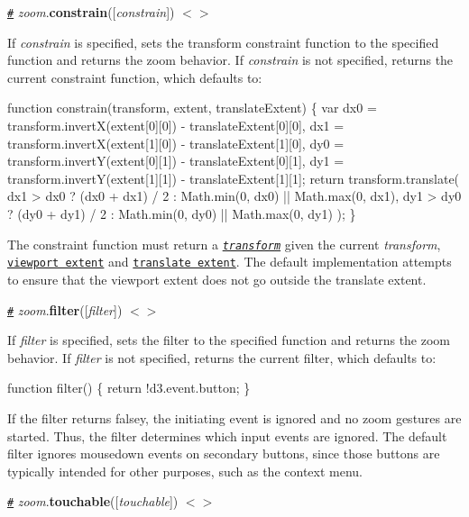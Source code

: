 \href{#zoom_constrain}{\tt \#} {\itshape zoom}.{\bfseries constrain}(\mbox{[}{\itshape constrain}\mbox{]}) \href{https://github.com/d3/d3-zoom/blob/master/src/zoom.js#403}{\tt $<$$>$}

If {\itshape constrain} is specified, sets the transform constraint function to the specified function and returns the zoom behavior. If {\itshape constrain} is not specified, returns the current constraint function, which defaults to\+:


\begin{DoxyCode}
function constrain(transform, extent, translateExtent) \{
  var dx0 = transform.invertX(extent[0][0]) - translateExtent[0][0],
      dx1 = transform.invertX(extent[1][0]) - translateExtent[1][0],
      dy0 = transform.invertY(extent[0][1]) - translateExtent[0][1],
      dy1 = transform.invertY(extent[1][1]) - translateExtent[1][1];
  return transform.translate(
    dx1 > dx0 ? (dx0 + dx1) / 2 : Math.min(0, dx0) || Math.max(0, dx1),
    dy1 > dy0 ? (dy0 + dy1) / 2 : Math.min(0, dy0) || Math.max(0, dy1)
  );
\}
\end{DoxyCode}


The constraint function must return a \href{#zoom-transforms}{\tt {\itshape transform}} given the current {\itshape transform}, \href{#zoom_extent}{\tt viewport extent} and \href{#zoom_translateExtent}{\tt translate extent}. The default implementation attempts to ensure that the viewport extent does not go outside the translate extent.

\href{#zoom_filter}{\tt \#} {\itshape zoom}.{\bfseries filter}(\mbox{[}{\itshape filter}\mbox{]}) \href{https://github.com/d3/d3-zoom/blob/master/src/zoom.js#L386}{\tt $<$$>$}

If {\itshape filter} is specified, sets the filter to the specified function and returns the zoom behavior. If {\itshape filter} is not specified, returns the current filter, which defaults to\+:


\begin{DoxyCode}
function filter() \{
  return !d3.event.button;
\}
\end{DoxyCode}


If the filter returns falsey, the initiating event is ignored and no zoom gestures are started. Thus, the filter determines which input events are ignored. The default filter ignores mousedown events on secondary buttons, since those buttons are typically intended for other purposes, such as the context menu.

\href{#zoom_touchable}{\tt \#} {\itshape zoom}.{\bfseries touchable}(\mbox{[}{\itshape touchable}\mbox{]}) \href{https://github.com/d3/d3-zoom/blob/master/src/zoom.js#L390}{\tt $<$$>$}

